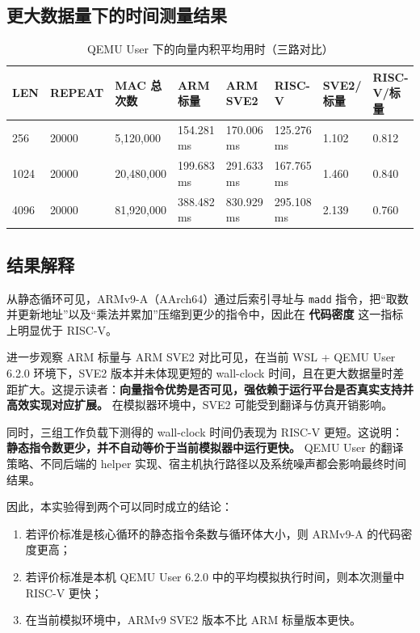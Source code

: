 \documentclass{article}
\begin{document}
\subsection{更大数据量下的时间测量结果}
\begin{table}[H]
    \centering
    \caption{QEMU User 下的向量内积平均用时（三路对比）}
    \begin{tabular}{p{} p{} p{} p{} p{} p{} p{} p{}}
        \toprule
        LEN & REPEAT & MAC 总次数 & ARM标量 & ARM SVE2 & RISC-V & SVE2/标量 & RISC-V/标量 \\
        \midrule
        256 & 20000 & 5,120,000 & 154.281 ms & 170.006 ms & 125.276 ms & 1.102 & 0.812 \\
        1024 & 20000 & 20,480,000 & 199.683 ms & 291.633 ms & 167.765 ms & 1.460 & 0.840 \\
        4096 & 20000 & 81,920,000 & 388.482 ms & 830.929 ms & 295.108 ms & 2.139 & 0.760 \\
        \bottomrule
    \end{tabular}
\end{table}

\subsection{结果解释}
从静态循环可见，ARMv9-A（AArch64）通过后索引寻址与 \texttt{madd} 指令，把“取数并更新地址”以及“乘法并累加”压缩到更少的指令中，因此在 \textbf{代码密度} 这一指标上明显优于 RISC-V。

进一步观察 ARM 标量与 ARM SVE2 对比可见，在当前 WSL + QEMU User 6.2.0 环境下，SVE2 版本并未体现更短的 wall-clock 时间，且在更大数据量时差距扩大。这提示读者：\textbf{向量指令优势是否可见，强依赖于运行平台是否真实支持并高效实现对应扩展。} 在模拟器环境中，SVE2 可能受到翻译与仿真开销影响。

同时，三组工作负载下测得的 wall-clock 时间仍表现为 RISC-V 更短。这说明：\textbf{静态指令数更少，并不自动等价于当前模拟器中运行更快。} QEMU User 的翻译策略、不同后端的 helper 实现、宿主机执行路径以及系统噪声都会影响最终时间结果。

因此，本实验得到两个可以同时成立的结论：
\begin{enumerate}
    \item 若评价标准是核心循环的静态指令条数与循环体大小，则 ARMv9-A 的代码密度更高；
    \item 若评价标准是本机 QEMU User 6.2.0 中的平均模拟执行时间，则本次测量中 RISC-V 更快；
    \item 在当前模拟环境中，ARMv9 SVE2 版本不比 ARM 标量版本更快。
\end{enumerate}
\end{document}
